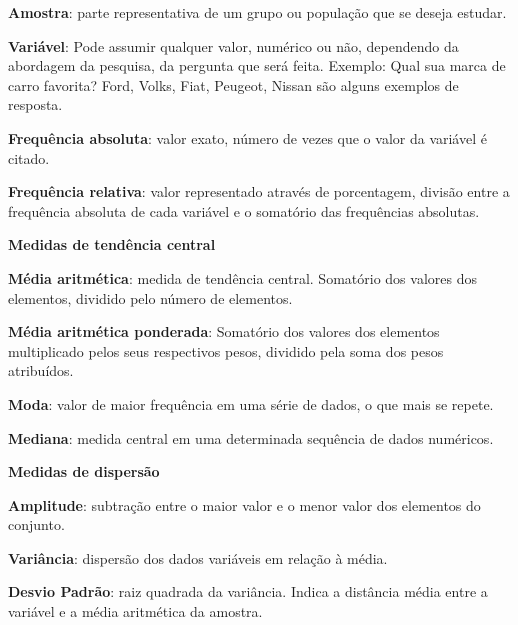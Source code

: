 \begin{multicols*}{2}
	\textbf{Amostra}: parte representativa de um grupo ou população que se deseja estudar.

	\textbf{Variável}: Pode assumir qualquer valor, numérico ou não, dependendo da abordagem da pesquisa, da pergunta que será feita. Exemplo: Qual sua marca de carro favorita? Ford, Volks, Fiat, Peugeot, Nissan são alguns exemplos de resposta.

	\textbf{Frequência absoluta}: valor exato, número de vezes que o valor da variável é citado.

	\textbf{Frequência relativa}: valor representado através de porcentagem, divisão entre a frequência absoluta de cada variável e o somatório das frequências absolutas.

	\textbf{Medidas de tendência central}

	\textbf{Média aritmética}: medida de tendência central. Somatório dos valores dos elementos, dividido pelo número de elementos.

	\textbf{Média aritmética ponderada}: Somatório dos valores dos elementos multiplicado pelos seus respectivos pesos, dividido pela soma dos pesos atribuídos.

	\textbf{Moda}: valor de maior frequência em uma série de dados, o que mais se repete.

	\textbf{Mediana}: medida central em uma determinada sequência de dados numéricos.

	\textbf{Medidas de dispersão}

	\textbf{Amplitude}: subtração entre o maior valor e o menor valor dos elementos do conjunto.

	\textbf{Variância}: dispersão dos dados variáveis em relação à média.

	\textbf{Desvio Padrão}: raiz quadrada da variância. Indica a distância média entre a variável e a média aritmética da amostra.


\end{multicols*}
